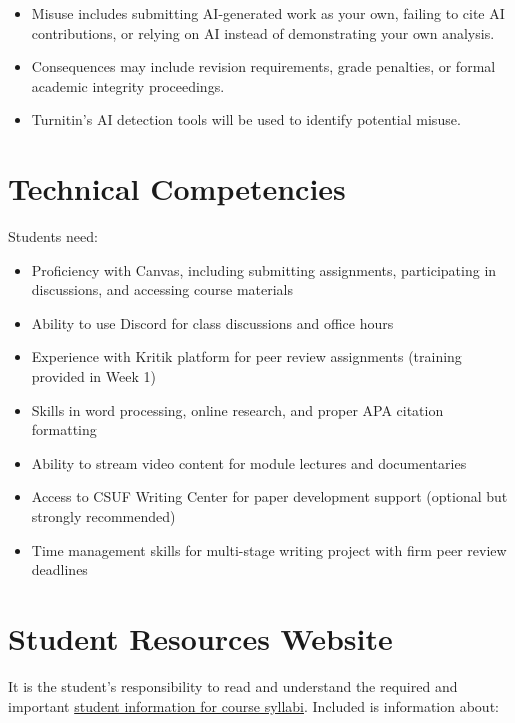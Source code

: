 \documentclass[12pt]{article}     %
\begin{document}
\begin{itemize}
    \item Misuse includes submitting AI-generated work as your own, failing to cite AI contributions, or relying on AI instead of demonstrating your own analysis.
    \item Consequences may include revision requirements, grade penalties, or formal academic integrity proceedings.
    \item Turnitin's AI detection tools will be used to identify potential misuse.
\end{itemize}

\section{Technical Competencies}
Students need:
\begin{itemize}
\item Proficiency with Canvas, including submitting assignments, participating in discussions, and accessing course materials
\item Ability to use Discord for class discussions and office hours
\item Experience with Kritik platform for peer review assignments (training provided in Week 1)
\item Skills in word processing, online research, and proper APA citation formatting
\item Ability to stream video content for module lectures and documentaries
\item Access to CSUF Writing Center for paper development support (optional but strongly recommended)
\item Time management skills for multi-stage writing project with firm peer review deadlines
\end{itemize}

\section{Student Resources Website}
It is the student's responsibility to read and understand the required and important \href{https://fdc.fullerton.edu/teaching/student-info-syllabi.html}{student information for course syllabi}. Included is information about:
\end{document}
